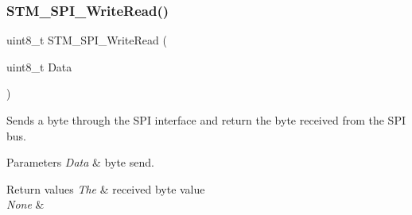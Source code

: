 \subsubsection{\texorpdfstring{STM\_SPI\_WriteRead()}{STM\_SPI\_WriteRead()}}
{\footnotesize\ttfamily uint8\+\_\+t S\+T\+M\+\_\+\+S\+P\+I\+\_\+\+Write\+Read (\begin{DoxyParamCaption}\item[{uint8\+\_\+t}]{Data }\end{DoxyParamCaption})}



Sends a byte through the S\+PI interface and return the byte received from the S\+PI bus. 


\begin{DoxyParams}{Parameters}
{\em Data} & byte send. \\
\hline
\end{DoxyParams}

\begin{DoxyRetVals}{Return values}
{\em The} & received byte value \\
\hline
{\em None} & \\
\hline
\end{DoxyRetVals}
